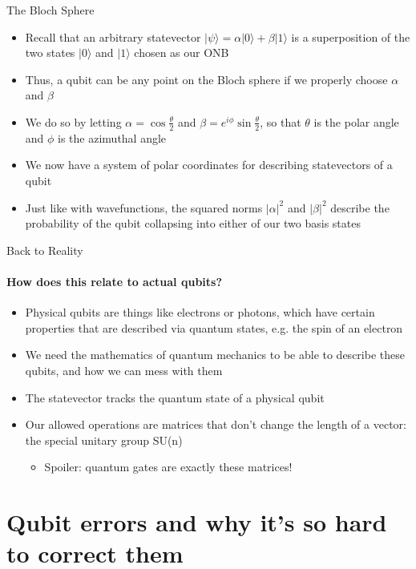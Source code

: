 \documentclass[aspectratio=169]{beamer}
\begin{document}
\begin{frame}{The Bloch Sphere}
    \begin{itemize}
        \item Recall that an arbitrary statevector $|\psi\rangle = \alpha|0\rangle + \beta|1\rangle$ is a superposition of the two states $|0\rangle$ and $|1\rangle$ chosen as our ONB \pause
        \item Thus, a qubit can be any point on the Bloch sphere if we properly choose $\alpha$ and $\beta$ \pause
        \item We do so by letting $\alpha = \cos{\frac{\theta}{2}}$ and $\beta = e^{i\phi}\sin{\frac{\theta}{2}}$, so that $\theta$ is the polar angle and $\phi$ is the azimuthal angle \pause
        \item We now have a system of polar coordinates for describing statevectors of a qubit \pause
        \item Just like with wavefunctions, the squared norms $|\alpha|^2$ and $|\beta|^2$ describe the probability of the qubit collapsing into either of our two basis states
    \end{itemize}
\end{frame}

\begin{frame}{Back to Reality}
\framesubtitle{How does this relate to actual qubits?}
\begin{itemize}
    \item Physical qubits are things like electrons or photons, which have certain properties that are described via quantum states, e.g. the spin of an electron \pause
    \item We need the mathematics of quantum mechanics to be able to describe these qubits, and how we can mess with them \pause
    \item The statevector tracks the quantum state of a physical qubit \pause
    \item Our allowed operations are matrices that don't change the length of a vector: the \textcolor{sigma@mainblue}{special unitary group SU(n)} \pause
    \begin{itemize}
        \item Spoiler: quantum gates are exactly these matrices!
    \end{itemize}
\end{itemize}
\end{frame}

\section{Qubit errors and why it's so hard to correct them}
\frame{\sectionpage}
\end{document}
